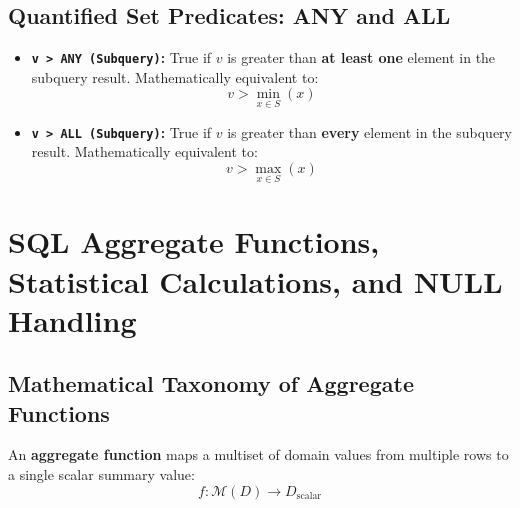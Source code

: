 \subsection{Quantified Set Predicates: ANY and ALL}
\begin{itemize}
    \item \textbf{\texttt{v > ANY (Subquery)}:} True if $v$ is greater than \textbf{at least one} element in the subquery result. Mathematically equivalent to:
    \[
    v > \min_{x \in S}(x)
    \]
    \item \textbf{\texttt{v > ALL (Subquery)}:} True if $v$ is greater than \textbf{every} element in the subquery result. Mathematically equivalent to:
    \[
    v > \max_{x \in S}(x)
    \]
\end{itemize}

\section{SQL Aggregate Functions, Statistical Calculations, and NULL Handling}
\label{sec:dbms_sql_aggregates}

\subsection{Mathematical Taxonomy of Aggregate Functions}
An \textbf{aggregate function} maps a multiset of domain values from multiple rows to a single scalar summary value:
\begin{equation}
f: \mathcal{M}(D) \to D_{\text{scalar}}
\end{equation}

